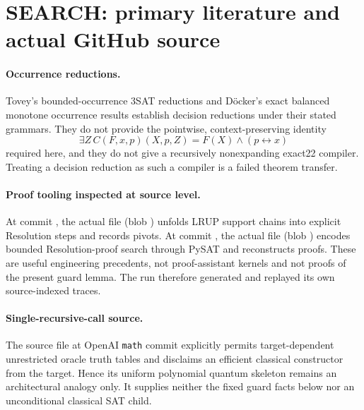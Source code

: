 \documentclass[11pt]{article}
\begin{document}
\section{SEARCH: primary literature and actual GitHub source}
\paragraph{Occurrence reductions.}
Tovey's bounded-occurrence 3SAT reductions and D\"ocker's exact balanced
monotone occurrence results establish decision reductions under their stated
grammars.  They do not provide the pointwise, context-preserving identity
\[
  \exists Z\,C(F,x,p)(X,p,Z)=F(X)\wedge(p\leftrightarrow x)
\]
required here, and they do not give a recursively nonexpanding exact22
compiler.  Treating a decision reduction as such a compiler is a failed
theorem transfer.

\paragraph{Proof tooling inspected at source level.}
At  commit
, the actual file
 (blob
) unfolds LRUP support
chains into explicit Resolution steps and records pivots.  At
 commit
, the actual file
 (blob
) encodes bounded
Resolution-proof search through PySAT and reconstructs proofs.  These are
useful engineering precedents, not proof-assistant kernels and not proofs of
the present guard lemma.  The run therefore generated and replayed its own
source-indexed traces.

\paragraph{Single-recursive-call source.}
The source file
at OpenAI \texttt{math} commit
 explicitly permits
target-dependent unrestricted oracle truth tables and disclaims an efficient
classical constructor from the target.  Hence its uniform polynomial quantum
skeleton remains an architectural analogy only.  It supplies neither the
fixed guard facts below nor an unconditional classical SAT child.
\end{document}
